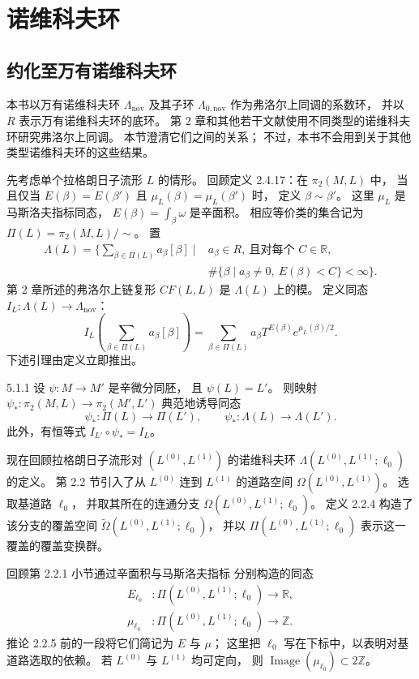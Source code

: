 
\section{诺维科夫环}
\label{sec:5-1}

\subsection{约化至万有诺维科夫环}
\label{subsec:5-1-1}

本书以万有诺维科夫环 $\Lambda_{\mathrm{nov}}$
及其子环 $\Lambda_{0,\mathrm{nov}}$
作为弗洛尔上同调的系数环，
并以 $R$ 表示万有诺维科夫环的底环。
第 2 章和其他若干文献使用不同类型的诺维科夫环研究弗洛尔上同调。
本节澄清它们之间的关系；
不过，本书不会用到关于其他类型诺维科夫环的这些结果。

先考虑单个拉格朗日子流形 $L$ 的情形。
回顾定义 2.4.17：在 $\pi_2(M,L)$ 中，
当且仅当 $E(\beta)=E(\beta')$ 且
$\mu_L(\beta)=\mu_L(\beta')$ 时，
定义 $\beta\sim\beta'$。
这里 $\mu_L$ 是马斯洛夫指标同态，
$E(\beta)=\int_\beta\omega$ 是辛面积。
相应等价类的集合记为
$\Pi(L)=\pi_2(M,L)/{\sim}$。
置
\[
\begin{aligned}
\Lambda(L)=
\biggl\{\sum_{\beta\in\Pi(L)}a_\beta[\beta]\;\bigg|\;&
a_\beta\in R,\ \text{且对每个 }C\in\mathbb R,\\
&\#\{\beta\mid a_\beta\ne0,\ E(\beta)<C\}<\infty
\biggr\}.
\end{aligned}
\]
第 2 章所述的弗洛尔上链复形 $CF(L,L)$
是 $\Lambda(L)$ 上的模。
定义同态 $I_L:\Lambda(L)\to\Lambda_{\mathrm{nov}}$：
\[
I_L\left(\sum_{\beta\in\Pi(L)}
a_\beta[\beta]\right)
=\sum_{\beta\in\Pi(L)}
a_\beta T^{E(\beta)}e^{\mu_L(\beta)/2}.
\]
下述引理由定义立即推出。

\begin{lemma}{5.1.1}\label{lem:5-1-1}
设 $\psi:M\to M'$ 是辛微分同胚，
且 $\psi(L)=L'$。
则映射
$\psi_*:\pi_2(M,L)\to\pi_2(M',L')$
典范地诱导同态
\[
\psi_*:\Pi(L)\to\Pi(L'),
\qquad
\psi_*:\Lambda(L)\to\Lambda(L').
\]
此外，有恒等式
$I_{L'}\circ\psi_*=I_L$。
\end{lemma}

现在回顾拉格朗日子流形对
$(L^{(0)},L^{(1)})$ 的诺维科夫环
$\Lambda(L^{(0)},L^{(1)};\ell_0)$
的定义。
第 2.2 节引入了从 $L^{(0)}$ 连到 $L^{(1)}$
的道路空间 $\Omega(L^{(0)},L^{(1)})$。
选取基道路 $\ell_0$，
并取其所在的连通分支
$\Omega(L^{(0)},L^{(1)};\ell_0)$。
定义 2.2.4 构造了该分支的覆盖空间
$\widetilde\Omega(L^{(0)},L^{(1)};\ell_0)$，
并以 $\Pi(L^{(0)},L^{(1)};\ell_0)$
表示这一覆盖的覆盖变换群。

回顾第 2.2.1 小节通过辛面积与马斯洛夫指标
分别构造的同态
\[
\begin{aligned}
E_{\ell_0}&:\Pi(L^{(0)},L^{(1)};\ell_0)
  \longrightarrow\mathbb R,\\
\mu_{\ell_0}&:\Pi(L^{(0)},L^{(1)};\ell_0)
  \longrightarrow\mathbb Z.
\end{aligned}
\]
推论 2.2.5 前的一段将它们简记为 $E$ 与 $\mu$；
这里把 $\ell_0$ 写在下标中，以表明对基道路选取的依赖。
若 $L^{(0)}$ 与 $L^{(1)}$ 均可定向，
则 $\operatorname{Image}(\mu_{\ell_0})\subset2\mathbb Z$。

